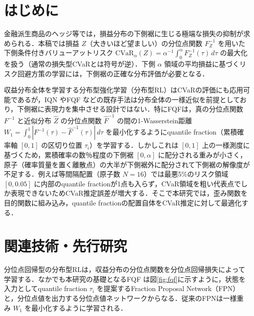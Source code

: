 \documentclass[a4paper,twocolumn,10pt]{jsarticle}
\newcommand{\CVaR}{\mathrm{CVaR}}
\begin{document}

\section{はじめに}
金融派生商品のヘッジ等では，損益分布の下側裾に生じる極端な損失の抑制が求められる．本稿では損益 $Z$（大きいほど望ましい）の分位点関数 $F_Z^{-1}$ を用いた下側条件付きバリューアットリスク $\CVaR_\alpha(Z) = \alpha^{-1}\int_0^\alpha F_Z^{-1}(\tau)\,d\tau$ \cite{rockafellar} の最大化を扱う（通常の損失型CVaRとは符号が逆）．下側 $\alpha$ 領域の平均損益に基づくリスク回避方策の学習には，下側裾の正確な分布評価が必要となる．

収益分布全体を学習する分布型強化学習（分布型RL）はCVaRの評価にも応用可能であるが，IQN \cite{iqn} やFQF \cite{fqf} などの既存手法は分布全体の一様近似を前提としており，下側裾に表現力を集中させる設計ではない．特にFQFは，真の分位点関数 $F^{-1}$ と近似分布 $\hat Z$ の分位点関数 $\hat F^{-1}$ の間の1-Wasserstein距離 $W_1 = \int_0^1 |F^{-1}(\tau) - \hat F^{-1}(\tau)|\,d\tau$ を最小化するようにquantile fraction（累積確率軸 $[0, 1]$ の区切り位置 $\tau_i$）を学習する．しかしこれは $[0,1]$ 上の一様測度に基づくため，累積確率の数％程度の下側裾 $[0, \alpha]$ に配分される重みが小さく，原子（確率質量を置く離散点）の大半が下側裾外に配分されて下側裾の解像度が不足する．例えば等間隔配置（原子数 $N=16$）では最悪5\%のリスク領域 $[0, 0.05]$ に内部のquantile fractionが1点も入らず，CVaR領域を粗い代表点でしか表現できないためCVaR推定誤差が増大する．そこで本研究では，歪み関数を目的関数に組み込み，quantile fractionの配置自体をCVaR推定に対して最適化する．

\section{関連技術・先行研究}
分位点回帰型の分布型RLは，収益分布の分位点関数を分位点回帰損失によって学習する．なかでも本研究の基礎となるFQF \cite{fqf} は図\ref{fig:fqf}に示すように，状態を入力としてquantile fraction $\tau_i$ を提案するFraction Proposal Network（FPN）と，分位点値を出力する分位点値ネットワークからなる．従来のFPNは一様重み $W_1$ を最小化するように学習される．
\end{document}
